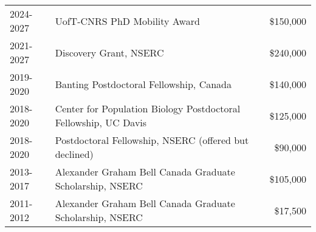 \documentclass[12pt]{article}
\begin{document}
\begin{tabular}{llr}
  2024-2027 & UofT-CNRS PhD Mobility Award & \$150,000\\
  2021-2027 & Discovery Grant, NSERC & \$240,000 \\
  2019-2020 & Banting Postdoctoral Fellowship, Canada & \$140,000 \\
  2018-2020 & Center for Population Biology Postdoctoral Fellowship, UC Davis & \$125,000 \\
  2018-2020 & Postdoctoral Fellowship, NSERC (offered but declined) & \$90,000 \\
  2013-2017 & Alexander Graham Bell Canada Graduate Scholarship, NSERC & \$105,000\\
  2011-2012 & Alexander Graham Bell Canada Graduate Scholarship, NSERC & \$17,500\\

\end{tabular}
\end{document}
